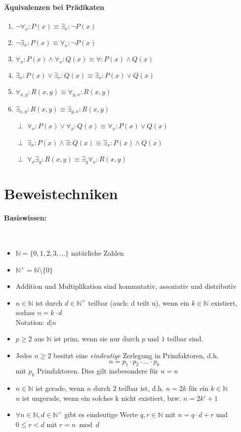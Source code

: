 \documentclass[10pt,a4paper]{article}
\begin{document}
\paragraph{\"Aquivalenzen bei Pr\"adikaten}
\begin{enumerate}
\item $\neg \forall_x : P(x) \equiv \exists_x: \neg P(x)$
\item $\neg \exists_x : P(x) \equiv \forall_x: \neg P(x)$
\item $\forall_x : P(x) \land \forall_x : Q(x) \equiv \forall : P(x) \land Q(x)$
\item $\exists_x : P(x) \lor \exists_x : Q(x) \equiv \exists_x : P(x) \lor Q(x)$
\item $\forall_{x,y} : R(x,y) \equiv \forall_{y,x} : R(x,y)$
\item $\exists_{x,y} : R(x,y) \equiv \exists_{y,x} : R(x,y)$
\item[$\perp$] $\forall_x : P(x) \lor \forall_x:Q(x) \equiv \forall_x : P(x) \lor Q(x)$
\item[$\perp$] $\exists_x : P(x) \land \exists : Q(x) \equiv \exists_x : P(x) \land Q(x)$
\item[$\perp$] $\forall_x \exists_y : R(x,y) \equiv \exists_y \forall_x : R(x,y)$
\end{enumerate}

\section{Beweistechniken}

\paragraph{Basiswissen:}
\ \\
\begin{itemize}
\item $\mathbb{N} = \{0,1,2,3,\ldots\}$ nat\"urliche Zahlen
\item $\mathbb{N}^{+} = \mathbb{N}\setminus\{0\}$
\item Addition und Multiplikation sind kommutativ, assoziativ und distributiv
\item $n\in\mathbb{N}$ ist durch $d\in\mathbb{N}^+$ teilbar (auch: \glqq d teilt u\grqq ), wenn ein $k\in\mathbb{N}$ existiert, sodass $n=k\cdot d$\\
Notation: $d|n$
\item $p\geq 2$ aus $\mathbb{N}$ ist prim, wenn sie nur durch $p$ und $1$ teilbar sind.
\item Jedes $n\geq 2$ besitzt eine \emph{eindeutige} Zerlegung in Primfaktoren, d.h.
\[
n = p_1 \cdot p_2 \cdot \ldots \cdot p_k
\]
mit $p_k$ Primfaktoren. Dies gilt insbesondere f\"ur $n=n$
\item $n\in\mathbb{N}$ ist gerade, wenn $n$ durch $2$ teilbar ist, d.h. $n=2k$ für ein $k\in\mathbb{N}$\\
$n$ ist ungerade, wenn ein solches k nicht existiert, bzw. $n=2k'+1$
\item $\forall n\in\mathbb{N},d\in\mathbb{N}^{+}$ gibt es eindeutige Werte $q,r\in\mathbb{N}$ mit $n=q\cdot d+r$ und $0\leq r< d$ mit $r=n\bmod d$
\end{itemize}
\end{document}
